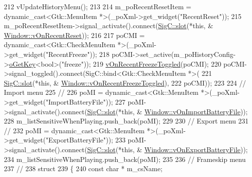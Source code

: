 \begin{DoxyCode}
{{212   vUpdateHistoryMenu();
213 
214   m\_poRecentResetItem = \textcolor{keyword}{dynamic\_cast<}Gtk::MenuItem *\textcolor{keyword}{>}(\_poXml->get\_widget(\textcolor{stringliteral}{"RecentReset"}));
215   m\_poRecentResetItem->signal\_activate().connect(\mbox{\hyperlink{namespace_sig_c_a92e4f19202b77e78ac1db05f5a62f6b6}{SigC::slot}}(*\textcolor{keyword}{this}, &
      \mbox{\hyperlink{class_v_b_a_1_1_window_a8f8de1653cccaa5c61312c68f4a037fe}{Window::vOnRecentReset}}));
216 
217   poCMI = \textcolor{keyword}{dynamic\_cast<}Gtk::CheckMenuItem *\textcolor{keyword}{>}(\_poXml->get\_widget(\textcolor{stringliteral}{"RecentFreeze"}));
218   poCMI->set\_active(m\_poHistoryConfig->\mbox{\hyperlink{class_v_b_a_1_1_config_1_1_section_ab169d7aae4e9dde91418ba1668e3ad39}{oGetKey}}<\textcolor{keywordtype}{bool}>(\textcolor{stringliteral}{"freeze"}));
219   \mbox{\hyperlink{class_v_b_a_1_1_window_aed773f053d4ab731d5a555dc940c0195}{vOnRecentFreezeToggled}}(poCMI);
220   poCMI->signal\_toggled().connect(SigC::bind<Gtk::CheckMenuItem *>(
221                                     \mbox{\hyperlink{namespace_sig_c_a92e4f19202b77e78ac1db05f5a62f6b6}{SigC::slot}}(*\textcolor{keyword}{this}, &
      \mbox{\hyperlink{class_v_b_a_1_1_window_aed773f053d4ab731d5a555dc940c0195}{Window::vOnRecentFreezeToggled}}),
222                                     poCMI));
223 
224   \textcolor{comment}{// Import menu}
225   \textcolor{comment}{//}
226   poMI = \textcolor{keyword}{dynamic\_cast<}Gtk::MenuItem *\textcolor{keyword}{>}(\_poXml->get\_widget(\textcolor{stringliteral}{"ImportBatteryFile"}));
227   poMI->signal\_activate().connect(\mbox{\hyperlink{namespace_sig_c_a92e4f19202b77e78ac1db05f5a62f6b6}{SigC::slot}}(*\textcolor{keyword}{this}, &
      \mbox{\hyperlink{class_v_b_a_1_1_window_aa376015acdd7b7fe83a67bc1306d3553}{Window::vOnImportBatteryFile}}));
228   m\_listSensitiveWhenPlaying.push\_back(poMI);
229 
230   \textcolor{comment}{// Export menu}
231   \textcolor{comment}{//}
232   poMI = \textcolor{keyword}{dynamic\_cast<}Gtk::MenuItem *\textcolor{keyword}{>}(\_poXml->get\_widget(\textcolor{stringliteral}{"ExportBatteryFile"}));
233   poMI->signal\_activate().connect(\mbox{\hyperlink{namespace_sig_c_a92e4f19202b77e78ac1db05f5a62f6b6}{SigC::slot}}(*\textcolor{keyword}{this}, &
      \mbox{\hyperlink{class_v_b_a_1_1_window_a26d233092dd624a0bd3734ec0cdc0d7c}{Window::vOnExportBatteryFile}}));
234   m\_listSensitiveWhenPlaying.push\_back(poMI);
235 
236   \textcolor{comment}{// Frameskip menu}
237   \textcolor{comment}{//}
238   \textcolor{keyword}{struct}
239   \{
240     \textcolor{keyword}{const} \textcolor{keywordtype}{char} * m\_csName;
}}
\end{DoxyCode}
